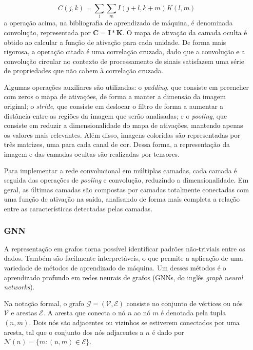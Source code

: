 \begin{equation}
    C(j, k) = \sum_{l} \sum_{m} I(j+l, k+m)K(l, m)
\end{equation}
a operação acima, na bibliografia de aprendizado de máquina, é denominada
convolução, representada por $\mathbf{C} = \mathbf{I} * \mathbf{K}$. O mapa de
ativação da camada oculta é obtido ao calcular a função de ativação para cada
unidade. De forma mais rigorosa, a operação citada é uma correlação cruzada, dado
que a convolução e a convolução circular no contexto de processamento de sinais
satisfazem uma série de propriedades que não cabem à correlação cruzada.

Algumas operações auxiliares são utilizadas: o \textit{padding}, que consiste em
preencher com zeros o mapa de ativações, de forma a manter a dimensão da imagem
original; o \textit{stride}, que consiste em deslocar o filtro de forma a
aumentar a distância entre as regiões da imagem que serão analisadas; e o
\textit{pooling}, que consiste em reduzir a dimensionalidade do mapa de
ativações, mantendo apenas os valores mais relevantes. Além disso, imagens
coloridas são representadas por três matrizes, uma para cada canal de cor. Dessa
forma, a representação da imagem e das camadas ocultas são realizadas por
tensores.

Para implementar a rede convolucional em múltiplas camadas, cada camada é
seguida das operações de \textit{pooling} e convolução, reduzindo a
dimensionalidade. Em geral, as últimas camadas são compostas por camadas
totalmente conectadas com uma função de ativação na saída, analisando de forma
mais completa a relação entre as características detectadas pelas camadas.

\subsubsection{GNN}
A representação em grafos torna possível identificar padrões
não-triviais entre os dados. Também são facilmente interpretáveis, o que
permite a aplicação de uma variedade de métodos de aprendizado de máquina. Um
desses métodos é o aprendizado profundo em redes neurais de grafos (GNNs, do
inglês \textit{graph neural networks}).


Na notação formal, o grafo $\mathcal{G} = (\mathcal{V}, \mathcal{E})$ consiste no conjunto de
vértices ou nós $\mathcal{V}$ e arestas $\mathcal{E}$. A aresta que conecta
o nó $n$ ao nó $m$ é denotada pela tupla $(n, m)$. Dois nós são adjacentes ou vizinhos
se estiverem conectados por uma aresta, tal que o conjunto dos nós adjacentes a $n$
é dado por $\mathcal{N}(n) = \{m : (n, m) \in \mathcal{E}\}$.

